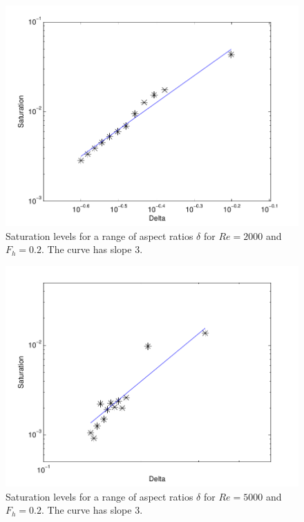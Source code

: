 \begin{figure}
\begin{center}
\includegraphics[width=\textwidth]{re2000_fh02_saturations} 
\caption{Saturation levels for a range of aspect ratios $\delta$ for $Re=2000$ and $F_{h}=0.2$. The curve has slope $3$.}
\label{re2000sat}
\end{center}
\end{figure}
\begin{figure}
\begin{center}
\includegraphics[width=\textwidth]{re5000_fh02_saturation_levels} 
\caption{Saturation levels for a range of aspect ratios $\delta$ for $Re=5000$ and $F_{h}=0.2$. The curve has slope $3$. }
\label{re5000sat}
\end{center}
\end{figure} 
